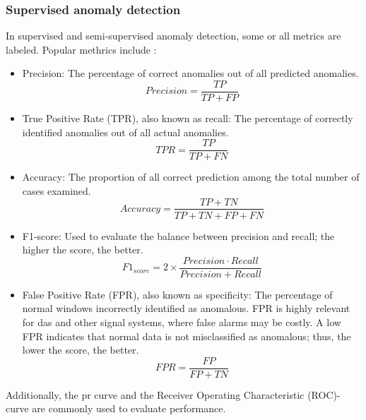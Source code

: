 \subsubsection{Supervised anomaly detection}
In supervised and semi-supervised anomaly detection, some or all metrics are labeled. Popular methrics include \cite{9439459}:
\begin{itemize}
    \item Precision: The percentage of correct anomalies out of all predicted anomalies.
    \begin{equation}
        Precision = \frac{TP}{TP + FP}
    \end{equation}

    \item True Positive Rate (TPR), also known as recall: The percentage of correctly identified anomalies out of all actual anomalies.
    \begin{equation}
        TPR = \frac{TP}{TP + FN}
    \end{equation}

    \item Accuracy: The proportion of all correct prediction among the total number of cases examined.
    \begin{equation}
        Accuracy = \frac{TP + TN}{TP + TN + FP + FN}
    \end{equation}

    \item F1-score: Used to evaluate the balance between precision and recall; the higher the score, the better. 
    \begin{equation}
        F1_{score} = 2 \times \frac{Precision \cdot Recall}{Precision + Recall}
    \end{equation}

    \item False Positive Rate (FPR), also known as specificity: The percentage of normal windows incorrectly identified as anomalous. FPR is highly relevant for \acrshort{das} and other signal systems, where false alarms may be costly. A low FPR indicates that normal data is not misclassified as anomalous; thus, the lower the score, the better.
    \begin{equation}
        FPR = \frac{FP}{FP + TN}
    \end{equation}
\end{itemize}

Additionally, the \acrfull{pr} curve and the Receiver Operating Characteristic (ROC)-curve are commonly used to evaluate performance.

